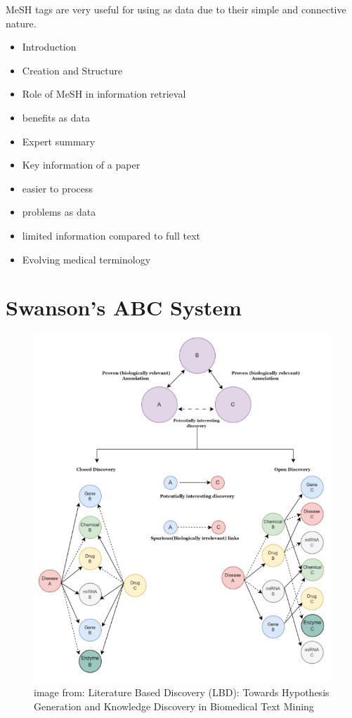 \documentclass{l4proj}
\begin{document}
 MeSH tags are very useful for using as data due to their simple and connective nature.

\begin{itemize}
    \item Introduction
    \item Creation and Structure
    \item Role of MeSH in information retrieval 
    \item benefits as data 
    \item Expert summary
    \item Key information of a paper
    \item easier to process
    \item problems as data
    \item limited information compared to full text
    \item Evolving medical terminology
\end{itemize}

\section{Swanson's ABC System}

\begin{figure}
    \centering
    \includegraphics[width=\linewidth]{images/abc_open_closed.png}
    \caption{image from: Literature Based Discovery (LBD): Towards Hypothesis Generation and Knowledge Discovery in Biomedical Text Mining}
    \label{fig:open_closed}
\end{figure}
\end{document}
